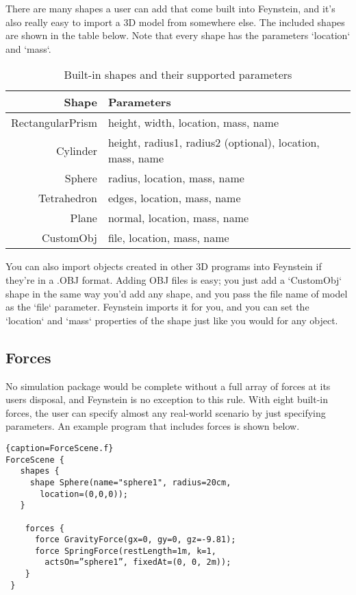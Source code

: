 There are many shapes a user can add that come built into Feynstein,
and it's also really easy to import a 3D model from somewhere
else. The included shapes are shown in the table below. Note that
every shape has the parameters `location` and `mass`.

\begin{table}\centering
  \begin{tabular}{r|l}
    \textbf{Shape} & \textbf{Parameters} \\ \hline
    RectangularPrism & height, width, location, mass, name \\
    Cylinder & height, radius1, radius2 (optional), location, mass, name \\
    Sphere & radius, location, mass, name \\
    Tetrahedron & edges, location, mass, name \\
    Plane & normal, location, mass, name \\
    CustomObj & file, location, mass, name \\
  \end{tabular} 
\caption{Built-in shapes and their supported parameters}
\label{tab:shapes}
\end{table}

You can also import objects created in other 3D programs into
Feynstein if they're in a .OBJ format. Adding OBJ files is easy; you
just add a `CustomObj` shape in the same way you'd add any shape, and
you pass the file name of model as the `file` parameter. Feynstein
imports it for you, and you can set the `location` and `mass`
properties of the shape just like you would for any object.

\subsection{Forces}
No simulation package would be complete without a full array of forces
at its users disposal, and Feynstein is no exception to this
rule. With eight built-in forces, the user can specify almost any
real-world scenario by just specifying parameters. An example program
that includes forces is shown below.

\begin{lstlisting}{caption=ForceScene.f}
ForceScene {
   shapes {
     shape Sphere(name="sphere1", radius=20cm, 
       location=(0,0,0));
   }

    forces {
      force GravityForce(gx=0, gy=0, gz=-9.81);
      force SpringForce(restLength=1m, k=1, 
        actsOn=”sphere1”, fixedAt=(0, 0, 2m));
    }
 }
\end{lstlisting}

